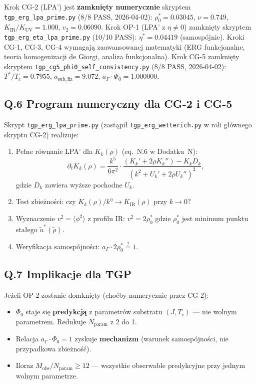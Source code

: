 \medskip\noindent
Krok CG-2 (LPA') jest \textbf{zamknięty numerycznie} skryptem
\texttt{tgp\_erg\_lpa\_prime.py} (8/8 PASS, 2026-04-02):
$\rho_0^*=0.03045$, $\nu=0.749$, $K_\mathrm{IR}/K_\mathrm{UV}=1.000$,
$v_2=0.06090$.
Krok OP-1 (LPA' z $\eta\neq0$) zamknięty skryptem
\texttt{tgp\_erg\_eta\_lpa\_prime.py} (10/10 PASS):
$\eta^*=0.04419$ (samospójnie).
Kroki CG-1, CG-3, CG-4 wymagają zaawansowanej matematyki
(ERG funkcjonalne, teoria homogenizacji de Giorgi, analiza funkcjonalna).
Krok CG-5 zamknięty skryptem \texttt{tgp\_cg5\_phi0\_self\_consistency.py}
(8/8 PASS, 2026-04-02): $T^*/T_c = 0.7955$, $a_\mathrm{sub,fiz} = 9.072$,
$a_\Gamma\cdot\Phi_0 = 1.000000$.

\subsection*{Q.6 Program numeryczny dla CG-2 i CG-5}

Skrypt \texttt{tgp\_erg\_lpa\_prime.py} (zastąpił
\texttt{tgp\_erg\_wetterich.py} w roli głównego skryptu CG-2) realizuje:
\begin{enumerate}
  \item Pełne równanie LPA' dla $K_k(\rho)$ (eq.~N.6 w Dodatku~N):
        \begin{equation}
          \partial_t K_k(\rho) = \frac{k^5}{6\pi^2} \cdot
          \frac{(K_k' + 2\rho K_k'') - K_k D_k}{(k^2 + U_k' + 2\rho U_k'')^2},
        \end{equation}
        gdzie $D_k$ zawiera wyższe pochodne $U_k$.
  \item Test zbieżności: czy $K_k(\rho)/k^\eta \to K_\mathrm{IR}(\rho)$ przy $k \to 0$?
  \item Wyznaczenie $v^2 = \langle\phi^2\rangle$ z profilu IR: $v^2 = 2\rho_0^*$
        gdzie $\rho_0^*$ jest minimum punktu stałego $\tilde u^*(\tilde\rho)$.
  \item Weryfikacja samospójności: $a_\Gamma \cdot 2\rho_0^* \stackrel{?}{=} 1$.
\end{enumerate}

\subsection*{Q.7 Implikacje dla TGP}

Jeżeli OP-2 zostanie domknięty (choćby numerycznie przez CG-2):
\begin{itemize}
  \item $\Phi_0$ staje się \textbf{predykcją} z parametrów substratu $(J, T_c)$
        — nie wolnym parametrem. Redukuje $N_\mathrm{param}$ z 2 do 1.
  \item Relacja $a_\Gamma \cdot \Phi_0 = 1$ zyskuje \textbf{mechanizm}
        (warunek samospójności, nie przypadkowa zbieżność).
  \item Iloraz $M_\mathrm{obs}/N_\mathrm{param} \geq 12$ — wszystkie
        obserwable predykcyjne przy jednym wolnym parametrze.
\end{itemize}

